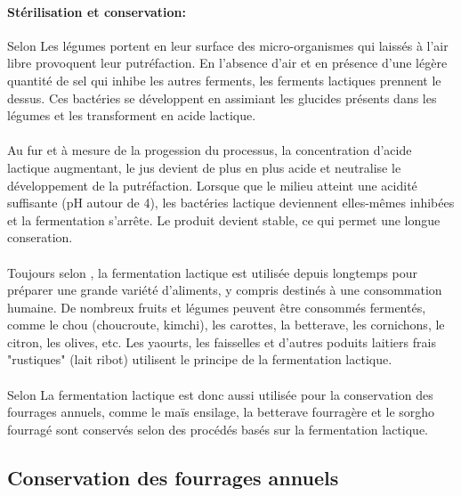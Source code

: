\documentclass[12pt,a4paper]{report}
\begin{document}
\paragraph{Stérilisation et conservation:} Selon \cite{wikipedia_fermentation_2018} Les légumes portent en leur surface des micro-organismes qui laissés à l'air libre provoquent leur putréfaction. En l'absence d'air et en présence d'une légère quantité de sel qui inhibe les autres ferments, les ferments lactiques prennent le dessus. Ces bactéries se développent en assimiant les glucides présents dans les légumes et les transforment en acide lactique. 

\paragraph{}Au fur et à mesure de la progession du processus, la concentration d'acide lactique augmentant, le jus devient de plus en plus acide et neutralise le développement de la putréfaction. Lorsque que le milieu atteint une acidité suffisante (pH autour de 4), les bactéries lactique deviennent elles-mêmes inhibées et la fermentation s'arrête. Le produit devient stable, ce qui permet une longue conseration.

\paragraph{}Toujours selon \cite{wikipedia_fermentation_2018}, la fermentation lactique est utilisée depuis longtemps pour préparer une grande variété d'aliments, y compris destinés à une consommation humaine. De nombreux fruits et légumes peuvent être consommés fermentés, comme le chou (choucroute, kimchi), les carottes, la betterave, les cornichons, le citron, les olives, etc. Les yaourts, les faisselles et d'autres poduits laitiers frais "rustiques" (lait ribot) utilisent le principe de la fermentation lactique. 

\paragraph{}Selon \cite{maciejewski_productions_2015}La fermentation lactique est donc aussi utilisée pour la conservation des fourrages annuels, comme le maïs ensilage, la betterave fourragère et le sorgho fourragé sont conservés selon des procédés basés sur la fermentation lactique.

\subsection{Conservation des fourrages annuels}
\end{document}
